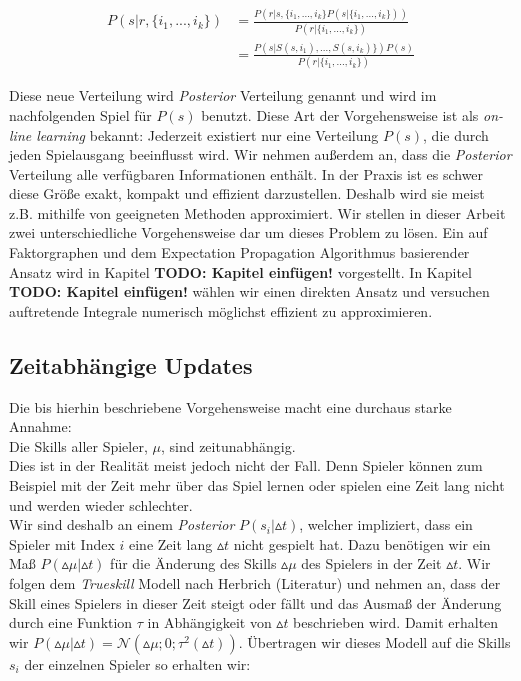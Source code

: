 \documentclass[12pt,a4paper]{scrartcl}
\numberwithin{equation}{section}
\begin{document}
\begin{equation}
 \begin{split}
 P(s|r,\{i_1,...,i_k\}) &= \frac{P(r|s,\{i_1,...,i_k\}P(s|\{i_1,...,i_k\}))}{P(r|\{i_1,...,i_k\})} \\ 
 &= \frac{P(s|S(s,i_1),...,S(s,i_k)\})P(s)}{P(r|\{i_1,...,i_k\})}
 \end{split}
 \end{equation}

Diese neue Verteilung wird \textit{Posterior} Verteilung genannt und wird im nachfolgenden Spiel für $P(s)$ benutzt.
Diese Art der Vorgehensweise ist als \textit{on-line learning} bekannt: Jederzeit existiert nur eine Verteilung $P(s)$, die durch jeden Spielausgang
beeinflusst wird. Wir nehmen außerdem an, dass die \textit{Posterior} Verteilung alle verfügbaren Informationen enthält. In der Praxis ist es schwer diese Größe exakt, kompakt 
und effizient darzustellen. Deshalb wird sie meist z.B. mithilfe von geeigneten Methoden approximiert. 
Wir stellen in dieser Arbeit zwei unterschiedliche Vorgehensweise dar um dieses Problem zu lösen. Ein auf Faktorgraphen und dem Expectation Propagation Algorithmus basierender Ansatz wird in Kapitel
\textbf{TODO: Kapitel einfügen!} vorgestellt. In Kapitel \textbf{TODO: Kapitel einfügen!} wählen wir einen direkten Ansatz und versuchen auftretende Integrale numerisch möglichst effizient zu approximieren. 

\subsection{Zeitabhängige Updates}

Die bis hierhin beschriebene Vorgehensweise macht eine durchaus starke Annahme: \\
Die Skills aller Spieler, $\mu$, sind zeitunabhängig.\\
Dies ist in der Realität meist jedoch nicht der Fall. Denn Spieler können zum Beispiel mit der Zeit mehr über das Spiel lernen oder spielen eine Zeit lang nicht und 
werden wieder schlechter. 
\\
Wir sind deshalb an einem \textit{Posterior} $P(s_i| \vartriangle t)$, welcher impliziert, dass ein Spieler mit Index $i$ eine Zeit lang $\vartriangle t$ nicht gespielt hat.
Dazu benötigen wir ein Maß $P(\vartriangle \mu | \vartriangle t)$ für die Änderung des Skills $\vartriangle \mu$ des Spielers in der Zeit $\vartriangle t$.
Wir folgen dem \textit{Trueskill} Modell nach Herbrich (Literatur) und nehmen an, dass der Skill eines Spielers in dieser Zeit steigt oder fällt und das Ausmaß der Änderung durch eine Funktion $\tau$ in
Abhängigkeit von $\vartriangle t$ beschrieben wird.
Damit erhalten wir $P(\vartriangle \mu | \vartriangle t) = \mathcal{N}(\vartriangle \mu; 0;\tau^2(\vartriangle t))$.
Übertragen wir dieses Modell auf die Skills $s_i$ der einzelnen Spieler so erhalten wir: 
\end{document}

